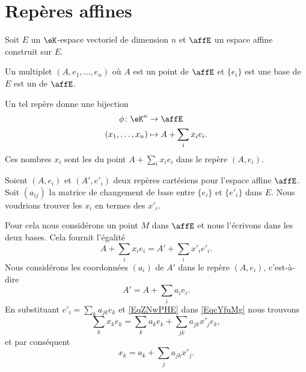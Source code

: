 \section{Repères affines}

Soit \( E\) un \( \eK\)-espace vectoriel de dimension \( n\) et \( \affE\) un espace affine construit sur \( E\).
\begin{definition}      \label{DEFooQELZooEXvxgw}
    Un multiplet \( (A,e_1,\ldots, e_n)\) où \( A\) est un point de \( \affE\) et \( \{ e_i \}\) est une base de \( E\) est un  de \( \affE\).
\end{definition}
Un tel repère donne une bijection
\begin{equation}
    \begin{aligned}
        \phi\colon \eK^n&\to \affE \\
        (x_1,\ldots, x_n)&\mapsto A+\sum_ix_ie_i.
    \end{aligned}
\end{equation}
Ces nombres \( x_i\) sont les  du point \( A+\sum_ix_ie_i\) dans le repère \( (A,e_i)\).

Soient \( (A,e_i)\) et \( (A',e'_i)\) deux repères cartésiens pour l'espace affine \( \affE\). Soit \( (a_{ij})\) la matrice de changement de base entre \( \{ e_i \}\) et \( \{ e'_i \}\) dans \( E\). Nous voudrions trouver les \( x_i\) en termes des \( x'_i\).

Pour cela nous considérons un point \( M\) dans \( \affE\) et nous l'écrivons dans les deux bases. Cela fournit l'égalité
\begin{equation}        \label{EqcYfuMg}
    A+\sum_ix_ie_i=A'+\sum_ix'_ie'_i.
\end{equation}
Nous considérons les coordonnées \( (a_i)\) de \( A'\) dans le repère \( (A,e_i)\), c'est-à-dire
\begin{equation}    \label{EqZNwPHE}
    A'=A+\sum_ia_ie_i.
\end{equation}
En substituant \( e'_i=\sum_ka_{jk}e_k\) et \eqref{EqZNwPHE} dans \eqref{EqcYfuMg} nous trouvons
\begin{equation}
    \sum_kx_ke_k=\sum_ka_ke_k+\sum_{jk}a_{jk}x'_je_k,
\end{equation}
et par conséquent
\begin{equation}
    x_k=a_k+\sum_ja_{jk}x'_j.
\end{equation}


